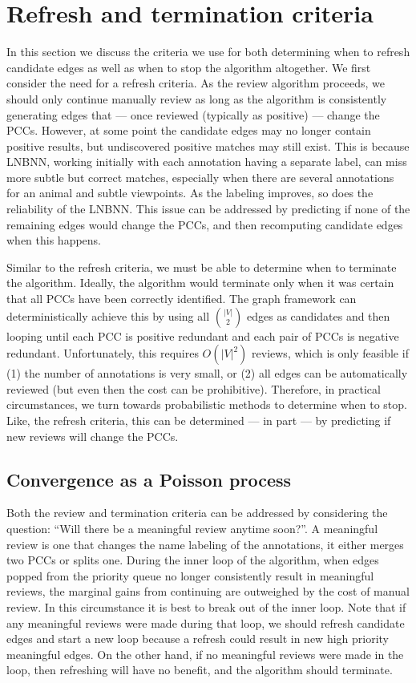 \section{Refresh and termination criteria}\label{sec:converge}


In this section we discuss the criteria we use for both determining when to refresh candidate edges as well as
  when to stop the algorithm altogether.
We first consider the need for a refresh criteria.
As the review algorithm proceeds, we should only continue manually review as long as the algorithm is
  consistently generating edges that --- once reviewed (typically as positive) --- change the PCCs.
However, at some point the candidate edges may no longer contain positive results, but undiscovered positive
  matches may still exist.
This is because LNBNN, working initially with each annotation having a separate label, can miss more subtle but
  correct matches, especially when there are several annotations for an animal and subtle viewpoints.
As the labeling improves, so does the reliability of the LNBNN.
This issue can be addressed by predicting if none of the remaining edges would change the PCCs, and then
  recomputing candidate edges when this happens.

Similar to the refresh criteria, we must be able to determine when to terminate the algorithm.
Ideally, the algorithm would terminate only when it was certain that all PCCs have been correctly identified.
The graph framework can deterministically achieve this by using all $\binom{|V|}{2}$ edges as candidates and then
  looping until each PCC is positive redundant and each pair of PCCs is negative redundant.
Unfortunately, this requires $O(|V|^2)$ reviews, which is only feasible if
(1) the number of annotations is very small, or
(2) all edges can be automatically reviewed (but even then the cost can be prohibitive).
Therefore, in practical circumstances, we turn towards probabilistic methods to determine when to stop.
Like, the refresh criteria, this can be determined --- in part --- by predicting if new reviews will change the
  PCCs.

\subsection{Convergence as a Poisson process}

Both the review and termination criteria can be addressed by considering the question:
``Will there be a meaningful review anytime soon?''.
A meaningful review is one that changes the name labeling of the annotations, \ie{} it either merges two PCCs or
  splits one.
During the inner loop of the algorithm, when edges popped from the priority queue no longer consistently result
  in meaningful reviews, the marginal gains from continuing are outweighed by the cost of manual review.
In this circumstance it is best to break out of the inner loop.
Note that if any meaningful reviews were made during that loop, we should refresh candidate edges and start a new
  loop because a refresh could result in new high priority meaningful edges.
On the other hand, if no meaningful reviews were made in the loop, then refreshing will have no benefit, and the
  algorithm should terminate.

